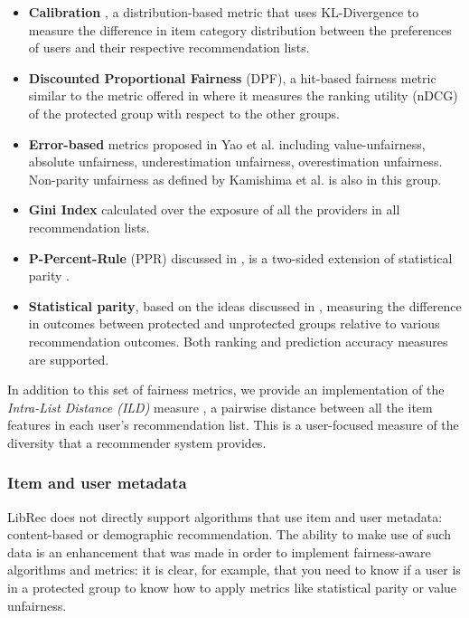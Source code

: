 \begin{itemize}
    \item \textbf{Calibration} \cite{steck2018calibrated}, a distribution-based metric that uses KL-Divergence to measure the difference in item category distribution between the preferences of users and their respective recommendation lists.
    \item \textbf{Discounted Proportional Fairness} (DPF), a hit-based fairness metric similar to the metric offered in \cite{castillo2019fairness} where it measures the ranking utility (nDCG) of the protected group with respect to the other groups. 
    \item \textbf{Error-based} metrics proposed in Yao et al. \cite{yao2017beyond} including value-unfairness, absolute unfairness, underestimation unfairness, overestimation unfairness. Non-parity unfairness as defined by Kamishima et al. \cite{kamishima2011fairness} is also in this group.
    \item \textbf{Gini Index} calculated over the exposure of all the providers in all recommendation lists. 
    \item \textbf{P-Percent-Rule} (PPR) discussed in \cite{biddle2006adverse}, is a two-sided extension of statistical parity \cite{barocas2016big}. 
    \item \textbf{Statistical parity}, based on the ideas discussed in \cite{zemel2013learning,ritov2017conditional}, measuring the difference in outcomes between protected and unprotected groups relative to various recommendation outcomes. Both ranking and prediction accuracy measures are supported.
\end{itemize}

In addition to this set of fairness metrics, we provide an implementation of the \textit{Intra-List Distance (ILD)} measure \cite{ziegler2005improving}, a pairwise distance between all the item features in each user’s recommendation list. This is a user-focused measure of the diversity that a recommender system provides. 

\subsubsection{Item and user metadata}
LibRec does not directly support algorithms that use item and user metadata: content-based or demographic recommendation. The ability to make use of such data is an enhancement that was made in order to implement fairness-aware algorithms and metrics: it is clear, for example, that you need to know if a user is in a protected group to know how to apply metrics like statistical parity or value unfairness. 

